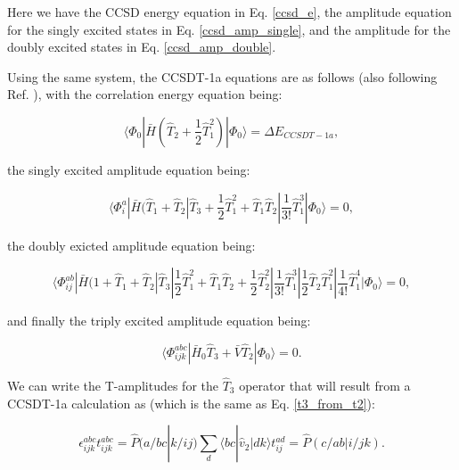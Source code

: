     Here we have the CCSD energy equation in Eq. \ref{ccsd_e}, the amplitude equation for the singly excited states in Eq. \ref{ccsd_amp_single}, and the amplitude for the doubly excited states in Eq. \ref{ccsd_amp_double}.
    
    Using the same system, the CCSDT-1a equations are as follows (also following Ref. \cite{Ref155}), with the correlation energy equation being:

    \begin{equation}
        \langle \Phi_0 | \bar{H} (\hat{T}_2 + \frac{1}{2}\hat{T}_1^2) | \Phi_0 \rangle = \Delta E_{CCSDT-1a},
    \end{equation}    

    the singly excited amplitude equation being:

    \begin{equation}
        \langle \Phi_i^a | \bar{H} (\hat{T}_1 + \hat{T}_2 | \hat{T}_3 + \frac{1}{2}\hat{T}_1^2 + \hat{T}_1\hat{T}_2 | \frac{1}{3!} \hat{T}_1^3 | \Phi_0 \rangle = 0,
    \end{equation}

    the doubly exicted amplitude equation being:

    \begin{equation}
        \langle \Phi^{ab}_{ij} | \bar{H} (1 + \hat{T}_1 + \hat{T}_2 | \hat{T}_3 | \frac{1}{2}\hat{T}_1^2 + \hat{T}_1\hat{T}_2 + \frac{1}{2}\hat{T}_2^2 | \frac{1}{3!}\hat{T}_1^3 | \frac{1}{2}\hat{T}_2\hat{T}_1^2 | \frac{1}{4!}\hat{T}_1^4 | \Phi_0 \rangle = 0,
    \end{equation}

    and finally the triply excited amplitude equation being:
    
    \begin{equation}
        \langle \Phi_{ijk}^{abc} | \bar{H}_0\hat{T}_3 + \bar{V}\hat{T}_2 | \Phi_0 \rangle = 0.
    \end{equation}



      We can write the T-amplitudes for the $\hat{T}_3$ operator that will result from a CCSDT-1a calculation as (which is the same as Eq. \ref{t3_from_t2}):

    \begin{equation} \label{ccdt1_eq}
        \epsilon_{ijk}^{abc}t_{ijk}^{abc} = \hat{P}(a/bc|k/ij)\sum_d \langle bc | \hat{v}_2 | dk \rangle t_{ij}^{ad} = \hat{P}(c/ab|i/jk).
    \end{equation}

